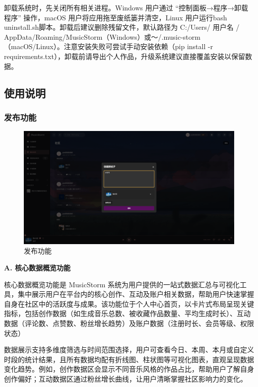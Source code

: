 \documentclass{base}
\numberwithin{figure}{section} %
\begin{document}
卸载系统时，先关闭所有相关进程。Windows 用户通过 “控制面板→程序→卸载程序” 操作，macOS 用户将应用拖至废纸篓并清空，Linux 用户运行bash uninstall.sh脚本。卸载后建议删除残留文件，默认路径为 C:/Users/ 用户名 / AppData/Roaming/MusicStorm（Windows）或～/.music-storm（macOS/Linux）。注意安装失败可尝试手动安装依赖（pip install -r requirements.txt），卸载前请导出个人作品，升级系统建议直接覆盖安装以保留数据。

\subsection{使用说明}

\subsubsection{发布功能}

\begin{figure}[H]
    \centering
    \includegraphics[width=\textwidth]{images/7-1.png}
    \caption{发布功能}
    \label{fig:post}
\end{figure}

\textbf{A. 核心数据概览功能}

核心数据概览功能是 MusicStorm 系统为用户提供的一站式数据汇总与可视化工具，集中展示用户在平台内的核心创作、互动及账户相关数据，帮助用户快速掌握自身在社区中的活跃度与成果。该功能位于个人中心首页，以卡片式布局呈现关键指标，包括创作数据（如生成音乐总数、被收藏作品数量、平均生成时长）、互动数据（评论数、点赞数、粉丝增长趋势）及账户数据（注册时长、会员等级、权限状态）

数据展示支持多维度筛选与时间范围选择，用户可查看今日、本周、本月或自定义时段的统计结果，且所有数据均配有折线图、柱状图等可视化图表，直观呈现数据变化趋势。例如，创作数据区会显示不同音乐风格的作品占比，帮助用户了解自身创作偏好；互动数据区通过粉丝增长曲线，让用户清晰掌握社区影响力的变化。
\end{document}
